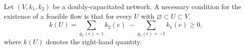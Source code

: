 Let $(V, k_1, k_2)$ be a doubly-capacitated network. A necessary condition for the existence of a feasible flow is that for every $U$ with $\varnothing \subset U \subset V$,
$$k(U) = \sum_{g_U(e)=1} k_2(e) \; - \!\! \sum_{g_U(e)=-1} k_1(e) \geq 0,$$
where $k(U)$ denotes the right-hand quantity.
